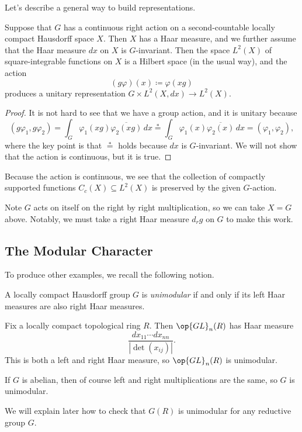 \documentclass{article}
\begin{document}
Let's describe a general way to build representations.
\begin{proposition} \label{prop:regular-action}
	Suppose that $G$ has a continuous right action on a second-countable locally compact Hausdorff space $X$. Then $X$ has a Haar measure, and we further assume that the Haar measure $dx$ on $X$ is $G$-invariant. Then the space $L^2(X)$ of square-integrable functions on $X$ is a Hilbert space (in the usual way), and the action
	\[(g\varphi)(x)\coloneqq\varphi(xg)\]
	produces a unitary representation $G\times L^2(X,dx)\to L^2(X)$.
\end{proposition}
\begin{proof}
	It is not hard to see that we have a group action, and it is unitary because
	\[(g\varphi_1,g\varphi_2)=\int_G\varphi_1(xg)\overline{\varphi_2(xg)}\,dx\stackrel*=\int_G\varphi_1(x)\overline{\varphi_2(x)}\,dx=(\varphi_1,\varphi_2),\]
	where the key point is that $\stackrel*=$ holds because $dx$ is $G$-invariant. We will not show that the action is continuous, but it is true.
\end{proof}
\begin{remark}
	Because the action is continuous, we see that the collection of compactly supported functions $C_c(X)\subseteq L^2(X)$ is preserved by the given $G$-action.
\end{remark}
\begin{example}
	Note $G$ acts on itself on the right by right multiplication, so we can take $X=G$ above. Notably, we must take a right Haar measure $d_rg$ on $G$ to make this work.
\end{example}

\subsection{The Modular Character}
To produce other examples, we recall the following notion.
\begin{definition}[unimodular]
	A locally compact Hausdorff group $G$ is \textit{unimodular} if and only if its left Haar measures are also right Haar measures.
\end{definition}
\begin{example}
	Fix a locally compact topological ring $R$. Then $\op{GL}_n(R)$ has Haar measure
	\[\frac{dx_{11}\cdots dx_{nn}}{\left|\det(x_{ij})\right|}.\]
	This is both a left and right Haar measure, so $\op{GL}_n(R)$ is unimodular.
\end{example}
\begin{example}
	If $G$ is abelian, then of course left and right multiplications are the same, so $G$ is unimodular.
\end{example}
We will explain later how to check that $G(R)$ is unimodular for any reductive group $G$.
\end{document}
